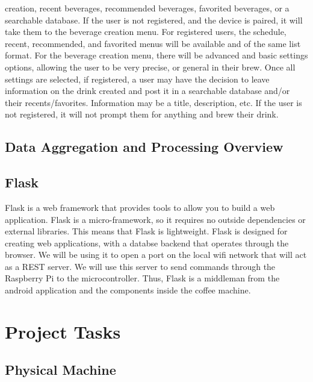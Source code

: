 \documentclass[conference]{IEEEtran}
\begin{document}
creation, recent beverages, recommended beverages, favorited beverages, or a searchable database. 
If the user is not registered, and the device is paired, it will take them to the beverage creation menu. 
For registered users, the schedule, recent, recommended, and favorited menus will be available and of 
the same list format. For the beverage creation menu, there will be advanced and basic settings 
options, allowing the user to be very precise, or general in their brew. Once all settings are selected, if 
registered, a user may have the decision to leave information on the drink created and post it in a 
searchable database and/or their recents/favorites. Information may be a title, description, etc. If the user is not registered, it will not prompt them for anything and brew their drink.

\subsection{Data Aggregation and Processing Overview}

\subsection{Flask}
Flask is a web framework that provides tools to allow you to build a web application.
Flask is a micro-framework, so it requires no outside dependencies or external libraries.
This means that Flask is lightweight. Flask is designed for creating web applications,
with a databse backend that operates through the browser. We will be using it to open
a port on the local wifi network that will act as a REST server. We will use this server to send
commands through the Raspberry Pi to the microcontroller. Thus, Flask is a middleman from the 
android application and the components inside the coffee machine.

\section{Project Tasks}

\subsection{Physical Machine}
\end{document}
